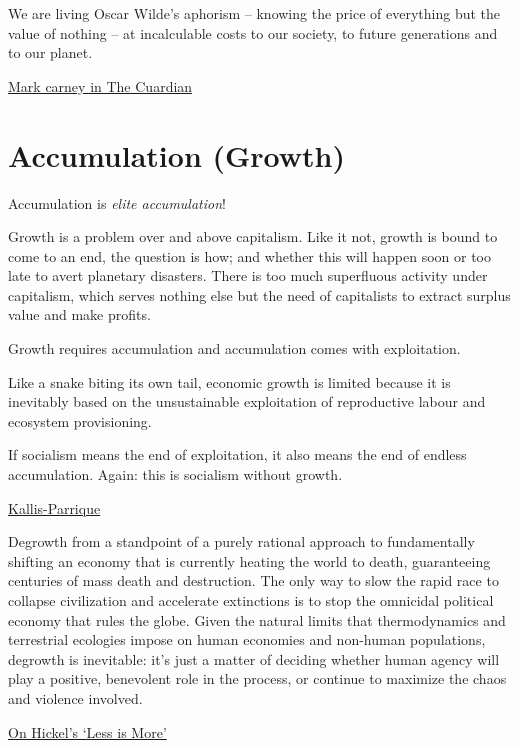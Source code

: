 \documentclass[
]{book}
\begin{document}
We are living Oscar Wilde's aphorism -- knowing the price of everything but the value of nothing -- at incalculable costs to our society, to future generations and to our planet.

\href{https://www.theguardian.com/business/2021/mar/13/crisis-in-values-exclusive-extract-mark-carneys-book}{Mark carney in The Cuardian}

\hypertarget{accumulation-growth}{%
\chapter{Accumulation (Growth)}\label{accumulation-growth}}

Accumulation is \emph{elite accumulation}!

Growth is a problem over and above capitalism.
Like it not, growth is bound to come to an end,
the question is how;
and whether this will happen soon or too late to avert planetary disasters.
There is too much superfluous activity under capitalism,
which serves nothing else but the need of capitalists
to extract surplus value and make profits.

Growth requires accumulation and accumulation comes with exploitation.

Like a snake biting its own tail, economic growth is limited because it is inevitably based on the unsustainable exploitation of reproductive labour and ecosystem provisioning.

If socialism means the end of exploitation,
it also means the end of endless accumulation.
Again: this is socialism without growth.

\href{https://braveneweurope.com/timothee-parrique-giorgos-kallis-degrowth-socialism-without-growth}{Kallis-Parrique}

Degrowth from a standpoint of a purely rational approach to fundamentally shifting an economy that is currently heating the world to death, guaranteeing centuries of mass death and destruction. The only way to slow the rapid race to collapse civilization and accelerate extinctions is to stop the omnicidal political economy that rules the globe. Given the natural limits that thermodynamics and terrestrial ecologies impose on human economies and non-human populations, degrowth is inevitable: it's just a matter of deciding whether human agency will play a positive, benevolent role in the process, or continue to maximize the chaos and violence involved.

\href{https://www.the-trouble.com/content/2021/2/11/ecosocialism-is-the-horizon-degrowth-is-the-way}{On Hickel's `Less is More'}
\end{document}
